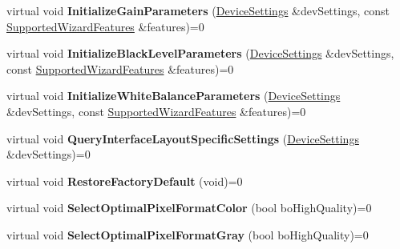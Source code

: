 \begin{DoxyCompactItemize}
\item 
\hypertarget{class_wizard_quick_setup_a5a783b376eecdaba24f56a5d2fef1fed}{virtual void {\bfseries Initialize\+Gain\+Parameters} (\hyperlink{struct_wizard_quick_setup_1_1_device_settings}{Device\+Settings} \&dev\+Settings, const \hyperlink{struct_wizard_quick_setup_1_1_supported_wizard_features}{Supported\+Wizard\+Features} \&features)=0}\label{class_wizard_quick_setup_a5a783b376eecdaba24f56a5d2fef1fed}

\item 
\hypertarget{class_wizard_quick_setup_af03d8981a55b013000ea7716c41d2f43}{virtual void {\bfseries Initialize\+Black\+Level\+Parameters} (\hyperlink{struct_wizard_quick_setup_1_1_device_settings}{Device\+Settings} \&dev\+Settings, const \hyperlink{struct_wizard_quick_setup_1_1_supported_wizard_features}{Supported\+Wizard\+Features} \&features)=0}\label{class_wizard_quick_setup_af03d8981a55b013000ea7716c41d2f43}

\item 
\hypertarget{class_wizard_quick_setup_aa33515976b5200426b82c6a4949f66be}{virtual void {\bfseries Initialize\+White\+Balance\+Parameters} (\hyperlink{struct_wizard_quick_setup_1_1_device_settings}{Device\+Settings} \&dev\+Settings, const \hyperlink{struct_wizard_quick_setup_1_1_supported_wizard_features}{Supported\+Wizard\+Features} \&features)=0}\label{class_wizard_quick_setup_aa33515976b5200426b82c6a4949f66be}

\item 
\hypertarget{class_wizard_quick_setup_a8f6c9dddc0fe3523df56e370906275e8}{virtual void {\bfseries Query\+Interface\+Layout\+Specific\+Settings} (\hyperlink{struct_wizard_quick_setup_1_1_device_settings}{Device\+Settings} \&dev\+Settings)=0}\label{class_wizard_quick_setup_a8f6c9dddc0fe3523df56e370906275e8}

\item 
\hypertarget{class_wizard_quick_setup_a878577d98939934cd2ce15aeafb7f99d}{virtual void {\bfseries Restore\+Factory\+Default} (void)=0}\label{class_wizard_quick_setup_a878577d98939934cd2ce15aeafb7f99d}

\item 
\hypertarget{class_wizard_quick_setup_a7d5cadde395c96c83ac783e2d07e8ac1}{virtual void {\bfseries Select\+Optimal\+Pixel\+Format\+Color} (bool bo\+High\+Quality)=0}\label{class_wizard_quick_setup_a7d5cadde395c96c83ac783e2d07e8ac1}

\item 
\hypertarget{class_wizard_quick_setup_a58b853e7cbbf28b7b2bcbb277bd07e13}{virtual void {\bfseries Select\+Optimal\+Pixel\+Format\+Gray} (bool bo\+High\+Quality)=0}\label{class_wizard_quick_setup_a58b853e7cbbf28b7b2bcbb277bd07e13}


\end{DoxyCompactItemize}
